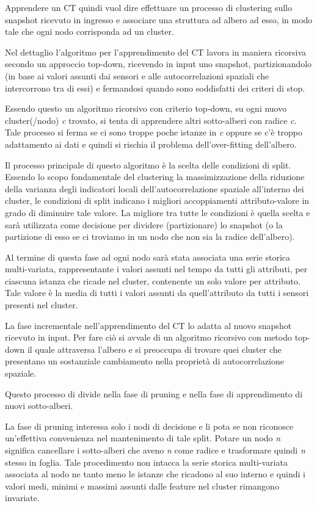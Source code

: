 \documentclass[12pt,a4paper,oneside,openright]{book}
\begin{document}
Apprendere un CT quindi vuol dire effettuare un processo di clustering sullo snapshot ricevuto in ingresso e associare una struttura ad albero ad esso, in modo tale che ogni nodo corrisponda ad un cluster. 

Nel dettaglio l'algoritmo per l'apprendimento del CT lavora in maniera ricorsiva secondo un approccio top-down, ricevendo in input uno snapshot, partizionandolo (in base ai valori assunti dai sensori e alle autocorrelazioni spaziali che intercorrono tra di essi) e fermandosi quando sono soddisfatti dei criteri di stop. 

Essendo questo un algoritmo ricorsivo con criterio top-down, su ogni nuovo cluster(/nodo) \textit{c} trovato, si tenta di apprendere altri sotto-alberi con radice \textit{c}. Tale processo si ferma se ci sono troppe poche istanze in \textit{c} oppure se c'è troppo adattamento ai dati e quindi si rischia il problema dell'over-fitting dell'albero.

Il processo principale di questo algoritmo è la scelta delle condizioni di split. Essendo lo scopo fondamentale del clustering la massimizzazione della riduzione della varianza degli indicatori locali dell'autocorrelazione spaziale all'interno dei cluster, le condizioni di split indicano i migliori accoppiamenti attributo-valore in grado di diminuire tale valore. La migliore tra tutte le condizioni è quella scelta e sarà utilizzata come decisione per dividere (partizionare) lo snapshot (o la partizione di esso se ci troviamo in un nodo che non sia la radice dell'albero).

Al termine di questa fase ad ogni nodo sarà stata associata una serie storica multi-variata, rappresentante i valori assunti nel tempo da tutti gli attributi, per ciascuna istanza che ricade nel cluster, contenente un solo valore per attributo. Tale valore è la media di tutti i valori assunti da quell'attributo da tutti i sensori presenti nel cluster.

La fase incrementale nell'apprendimento del CT lo adatta al nuovo snapshot ricevuto in input. Per fare ciò si avvale di un algoritmo ricorsivo con metodo top-down il quale attraversa l'albero e si preoccupa di trovare quei cluster che presentano un sostanziale cambiamento nella proprietà di autocorrelazione spaziale. 

Questo processo di divide nella fase di pruning e nella fase di apprendimento di nuovi sotto-alberi.

La fase di pruning interessa solo i nodi di decisione e li pota se non riconosce un'effettiva convenienza nel mantenimento di tale split. Potare un nodo \textit{n} significa cancellare i sotto-alberi che aveno \textit{n} come radice e trasformare quindi \textit{n} stesso in foglia. Tale procedimento non intacca la serie storica multi-variata associata al nodo ne tanto meno le istanze che ricadono al suo interno e quindi i valori medi, minimi e massimi assunti dalle feature nel cluster rimangono invariate. 
\end{document}

